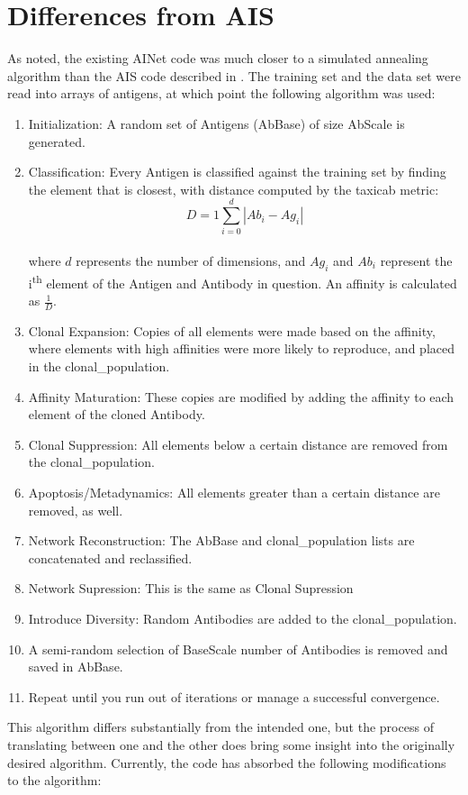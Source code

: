 \documentclass{article}
\theoremstyle{plain} %
\theoremstyle{remark}
\begin{document}
\section{Differences from AIS}
As noted, the existing AINet code was much closer to a simulated
annealing algorithm than the AIS code described in \cite{decastro}. 
The training set and the data set were read into arrays of antigens, at
which point the following algorithm was used:
\begin{enumerate}
\item Initialization: A random set of Antigens (AbBase) of size AbScale
is generated.

\item Classification: Every Antigen is classified against the training
set by finding the element that is closest, with distance computed
by the taxicab metric: 
\[D = 1\sum_{i=0}^d \left|Ab_i - Ag_i \right|\]\\
where $d$ represents the number of dimensions, and $Ag_i$ and $Ab_i$
represent the i\textsuperscript{th} element of the Antigen and Antibody
in question. An affinity is calculated as $\frac{1}{D}$.

\item Clonal Expansion: Copies of all elements were made based on the
affinity, where elements with high affinities were more likely to
reproduce, and placed in the clonal\_population.
\item Affinity Maturation: These copies are modified by adding the
affinity to each element of the cloned Antibody.
\item Clonal Suppression: All elements below a certain distance are
removed from the clonal\_population.
\item Apoptosis/Metadynamics: All elements greater than a certain
distance are removed, as well.
\item Network Reconstruction: The AbBase and clonal\_population lists
are concatenated and reclassified.
\item Network Supression: This is the same as Clonal Supression
\item Introduce Diversity: Random Antibodies are added to the
clonal\_population.
\item A semi-random selection of BaseScale number of Antibodies is
removed and saved in AbBase.
\item Repeat until you run out of iterations or manage a successful
convergence.
\end{enumerate}

This algorithm differs substantially from the intended one, but the
process of translating between one and the other does bring some insight
into the originally desired algorithm. Currently, the code has absorbed
the following modifications to the algorithm:
\end{document}
